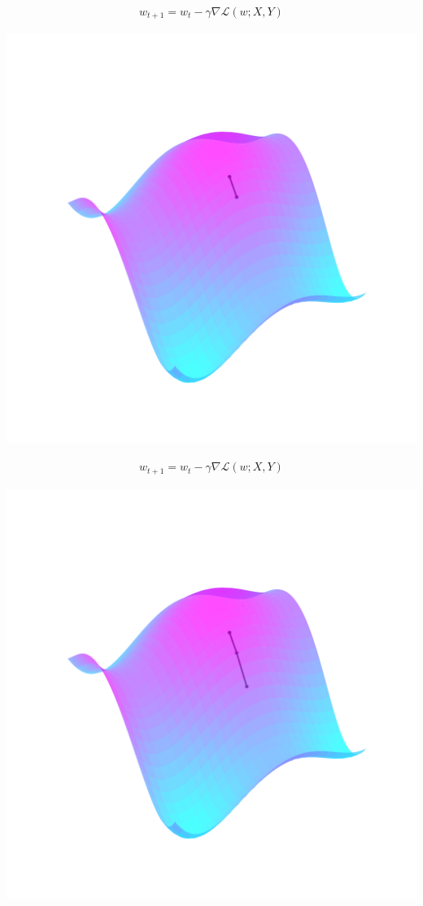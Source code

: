 \documentclass[notheorems]{beamer}
\begin{document}
\begin{frame}
  \begin{align}
    w_{t+1} = w_t - \gamma \nabla \mathcal L(w; X, Y) \nonumber
  \end{align}

  \vspace{-4em}

  \centering

  \includegraphics[width=0.8\linewidth]{images/gd_2.pdf}
\end{frame}
\addtocounter{framenumber}{-1}
\begin{frame}
  \begin{align}
    w_{t+1} = w_t - \gamma \nabla \mathcal L(w; X, Y) \nonumber
  \end{align}

  \vspace{-4em}

  \centering

  \includegraphics[width=0.8\linewidth]{images/gd_3.pdf}
\end{frame}
\end{document}
